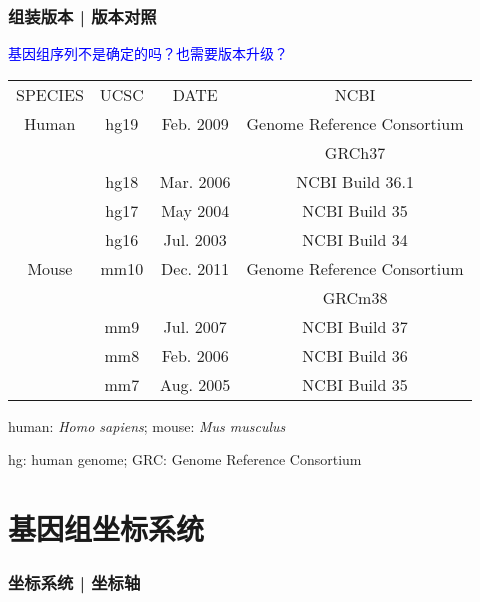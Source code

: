 \begin{frame}
  \frametitle{组装版本 | \alert{版本对照}}
  \begin{center}
    \textcolor{blue}{基因组序列不是确定的吗？也需要版本升级？}
  \end{center}
  \pause
  \begin{table}
    \centering
    \begin{tabular}{cccc}
      \hline
      \rowcolor{blue!50} SPECIES & UCSC & DATE & NCBI\\
      Human & hg19 & Feb. 2009 & Genome Reference Consortium\\
       & & & GRCh37\\
       & hg18 & Mar. 2006 & NCBI Build 36.1\\
       & hg17 & May 2004 & NCBI Build 35\\
       & hg16 & Jul. 2003 & NCBI Build 34\\
      \hline
      Mouse & mm10 & Dec. 2011 & Genome Reference Consortium\\
       & & & GRCm38\\
       & mm9 & Jul. 2007 & NCBI Build 37\\
       & mm8 & Feb. 2006 & NCBI Build 36\\
       & mm7 & Aug. 2005 & NCBI Build 35\\
      \hline
    \end{tabular}
  \end{table}
  \pause
  \begin{center}
    human: \textit{Homo sapiens}; mouse: \textit{\alert{M}us \alert{m}usculus}

    hg: \alert{h}uman \alert{g}enome; GRC: \alert{G}enome \alert{R}eference \alert{C}onsortium
  \end{center}
\end{frame}

\section{基因组坐标系统}
\begin{frame}
  \frametitle{坐标系统 | 坐标轴}
  \pause
  \pause
  \pause
\end{frame}

